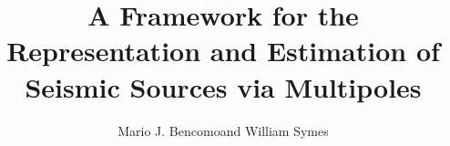 
\title{A Framework for the Representation and Estimation of Seismic Sources via Multipoles}
\date{}
\address{
        \footnotemark[1]The Rice Inversion Project,\\ Rice University,\\ Houston, TX
        77005-1892 USA\\
}
\author{Mario J. Bencomo\footnotemark[1] and William Symes\footnotemark[1]}


\maketitle
\parskip 12pt


\begin{abstract}



\end{abstract}
